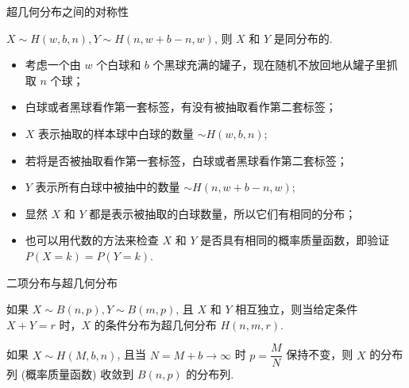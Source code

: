 \begin{frame}{超几何分布之间的对称性}
	\begin{thm}
		$X\sim H (w,b,n), Y\sim H (n,w+b-n,w)$, 则 $X$ 和 $Y$ 是同分布的.
	\end{thm}

	\pause
	\zheng
	\begin{itemize}[<+-|alert@+>]
		\item 考虑一个由 $w$ 个白球和 $b$ 个黑球充满的罐子，现在随机不放回地从罐子里抓取 $n$ 个球；
		\item 白球或者黑球看作第一套标签，有没有被抽取看作第二套标签；
		\item $X$ 表示抽取的样本球中白球的数量 $\sim H (w,b,n)$;
		\item 若将是否被抽取看作第一套标签，白球或者黑球看作第二套标签；
		\item $Y$ 表示所有白球中被抽中的数量 $\sim H (n,w+b-n,w)$;
		\item 显然 $X$ 和 $Y$ 都是表示被抽取的白球数量，所以它们有相同的分布；
		\item 也可以用代数的方法来检查 $X$ 和 $Y$ 是否具有相同的概率质量函数，即验证 $P (X=k)=P (Y=k)$.
	\end{itemize}
\end{frame}


\begin{frame}{二项分布与超几何分布}
	\begin{thm}
		如果 $X \sim B (n,p), Y \sim B (m,p)$, 且 $X$ 和 $Y$ 相互独立，则当给定条件 $X+Y=r$ 时，$X$ 的条件分布为超几何分布 $H (n,m,r)$.
	\end{thm}
	\vspace{0.5cm}
	\vspace{0.5cm}
	\begin{thm}
		如果 $X \sim H (M,b,n)$, 且当 $N=M+b \rightarrow \infty$ 时 $p=\dfrac{M}{N}$ 保持不变，则 $X$ 的分布列 (概率质量函数) 收敛到 $B (n,p)$ 的分布列.
	\end{thm}

\end{frame}




